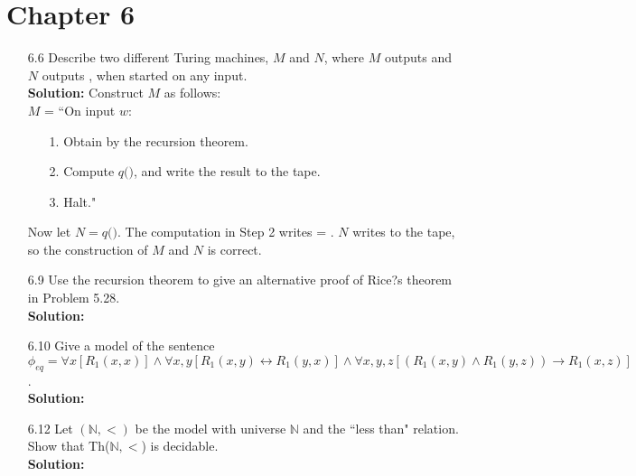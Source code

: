 \chapter*{Chapter 6}
\begin{enumerate}
\item[6.6]Describe two different Turing machines, $M$ and $N$, where $M$ outputs  and $N$ outputs , when started on any input.
\\
\textbf{Solution:} Construct $M$ as follows:
\\
$M$ = ``On input $w$:
\begin{enumerate}
\itemsep0em
\item[1.]Obtain  by the recursion theorem.
\item[2.]Compute $q($$)$, and write the result to the tape.
\item[3.]Halt."
\end{enumerate}
Now let $N = q($$)$. The computation in Step 2 writes  = . $N$ writes  to the tape, so the construction of $M$ and $N$ is correct.

\item[6.9]Use the recursion theorem to give an alternative proof of Rice?s theorem in Problem 5.28.
\\
\textbf{Solution:} \alreadyanswered

\item[6.10]Give a model of the sentence $\phi_{eq} = \forall x [R_1(x, x)] \wedge \forall x, y [R_1(x, y) \leftrightarrow R_1(y, x)] \wedge \forall x, y, z [(R_1(x, y) \wedge R_1(y, z)) \to R_1(x, z)]$.
\\
\textbf{Solution:} \alreadyanswered

\item[6.12]Let $(\mathbb{N} , <)$ be the model with universe $\mathbb{N}$ and the ``less than" relation. Show that Th($\mathbb{N} , <$) is decidable.
\\
\textbf{Solution:} \alreadyanswered


\end{enumerate}
